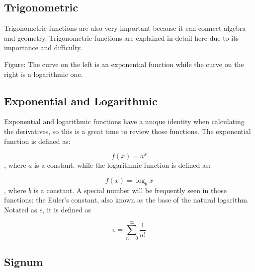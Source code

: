 \subsection{Trigonometric}
\label{sss:trig-4a83}




Trigonometric functions are also very important because it can connect algebra and
geometry. Trigonometric functions are explained in detail here due to its importance and
difficulty.






Figure: The curve on the left is an exponential function while the curve on the right is a
logarithmic one.




\subsection{Exponential and Logarithmic}
\label{sss:expo-d74f}




Exponential and logarithmic functions have a unique identity when calculating the
derivatives, so this is a great time to review those functions. The exponential function
is defined as:



$$f(x)=a^x$$, where $a$ is a constant. while the logarithmic function is defined as:



$$f(x)=\log _b x$$, where $b$ is a constant. A special number will be frequently seen in
those functions: the Euler's constant, also known as the base of the natural logarithm.
Notated as $e$, it is defined as

$$e=\sum _{n=0}^\infty \frac{1}{n!}$$




\subsection{Signum}
\label{sss:sign-327b}




